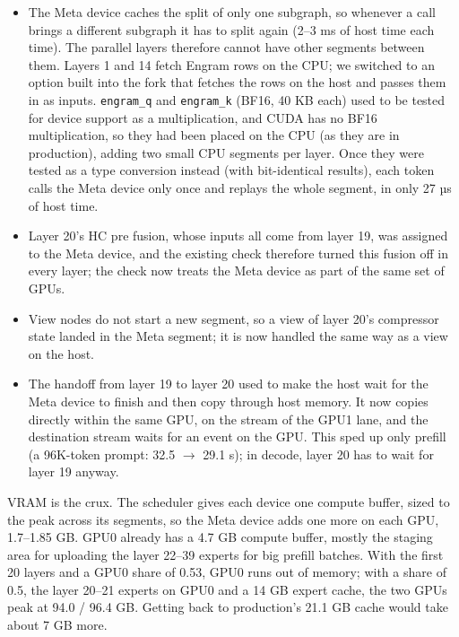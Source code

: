 \documentclass[11pt,a4paper]{article}
\newcommand{\code}[1]{\texttt{#1}}
\begin{document}
\begin{itemize}
  \item The Meta device caches the split of only one subgraph, so whenever a call brings a different subgraph it has to split again (2--3 ms of host time each time). The parallel layers therefore cannot have other segments between them. Layers 1 and 14 fetch Engram rows on the CPU; we switched to an option built into the fork that fetches the rows on the host and passes them in as inputs. \code{engram\_q} and \code{engram\_k} (BF16, 40 KB each) used to be tested for device support as a multiplication, and CUDA has no BF16 multiplication, so they had been placed on the CPU (as they are in production), adding two small CPU segments per layer. Once they were tested as a type conversion instead (with bit-identical results), each token calls the Meta device only once and replays the whole segment, in only 27 µs of host time.
  \item Layer 20's HC pre fusion, whose inputs all come from layer 19, was assigned to the Meta device, and the existing check therefore turned this fusion off in every layer; the check now treats the Meta device as part of the same set of GPUs.
  \item View nodes do not start a new segment, so a view of layer 20's compressor state landed in the Meta segment; it is now handled the same way as a view on the host.
  \item The handoff from layer 19 to layer 20 used to make the host wait for the Meta device to finish and then copy through host memory. It now copies directly within the same GPU, on the stream of the GPU1 lane, and the destination stream waits for an event on the GPU. This sped up only prefill (a 96K-token prompt: 32.5 $\to$ 29.1 s); in decode, layer 20 has to wait for layer 19 anyway.
\end{itemize}

VRAM is the crux. The scheduler gives each device one compute buffer, sized to the peak across its segments, so the Meta device adds one more on each GPU, 1.7--1.85 GB. GPU0 already has a 4.7 GB compute buffer, mostly the staging area for uploading the layer 22--39 experts for big prefill batches. With the first 20 layers and a GPU0 share of 0.53, GPU0 runs out of memory; with a share of 0.5, the layer 20--21 experts on GPU0 and a 14 GB expert cache, the two GPUs peak at 94.0 / 96.4 GB. Getting back to production's 21.1 GB cache would take about 7 GB more.
\end{document}

